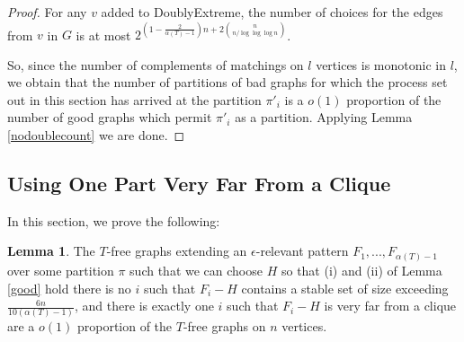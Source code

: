 \documentclass[12pt]{article}
\theoremstyle{definition}
\newtheorem{lemma}[theorem]{Lemma}
\begin{document}
\begin{proof}
For any $v$ added to DoublyExtreme, the number of choices for the edges from 
$v$ in $G$ is at most $2^{(1-\frac{2}{\alpha(T)-1})n+2{n \choose n/\log \log \log n}}$. 

So, since the number of complements of matchings on $l$ vertices is monotonic in $l$, we obtain that the number of  partitions of bad graphs for which 
the process set out in this section has arrived at the partition $\pi'_i$ is a $o(1)$ proportion of the number of good graphs which permit 
$\pi'_i$ as a partition. Applying Lemma \ref{nodoublecount} we are done. 
\end{proof} 


\subsection{Using One  Part  Very Far From a Clique} 

 In this section,  we prove the following: 


\begin{lemma}\label{nobigstable}
The  $T$-free  graphs extending an $\epsilon$-relevant pattern $F_1,...,F_{\alpha(T)-1}$  over some partition $\pi$ such that we can choose $H$ so that  (i) and (ii) of Lemma \ref{good} hold  there is no $i$ such that $F_i-H$ contains  a stable set of size exceeding $ \frac{6n}{10(\alpha(T)-1)}$,  and there is exactly one   $i$ such that $F_i-H$ is very far from a clique are   a $o(1)$ proportion of the $T$-free graphs on $n$ vertices.
\end{lemma}
\end{document}
